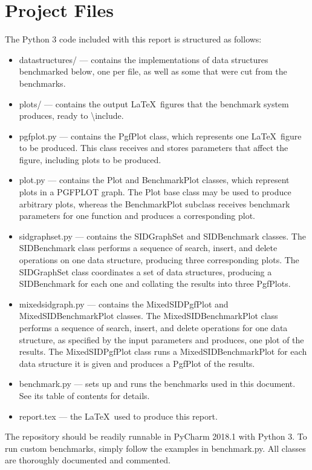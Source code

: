 \documentclass{article}
\begin{document}
\section{Project Files}
The Python 3 code included with this report is structured as follows:
\begin{itemize}
    \item datastructures/ --- contains the implementations of data structures benchmarked below, one per file, as well as some that were cut from the benchmarks.
    \item plots/ --- contains the output \LaTeX \ figures that the benchmark system produces, ready to \textbackslash include.
    \item pgfplot.py --- contains the PgfPlot class, which represents one \LaTeX \ figure to be produced. This class receives and stores parameters that affect the figure, including plots to be produced.
    \item plot.py --- contains the Plot and BenchmarkPlot classes, which represent plots in a PGFPLOT graph. The Plot base class may be used to produce arbitrary plots, whereas the BenchmarkPlot subclass receives benchmark parameters for one function and produces a corresponding plot.
    \item sidgraphset.py --- contains the SIDGraphSet and SIDBenchmark classes. The SIDBenchmark class performs a sequence of search, insert, and delete operations on one data structure, producing three corresponding plots. The SIDGraphSet class coordinates a set of data structures, producing a SIDBenchmark for each one and collating the results into three PgfPlots.
    \item mixedsidgraph.py --- contains the MixedSIDPgfPlot and MixedSIDBenchmarkPlot classes. The MixedSIDBenchmarkPlot class performs a sequence of search, insert, and delete operations for one data structure, as specified by the input parameters and produces, one plot of the results. The MixedSIDPgfPlot class runs a MixedSIDBenchmarkPlot for each data structure it is given and produces a PgfPlot of the results.
    \item benchmark.py --- sets up and runs the benchmarks used in this document. See its table of contents for details.
    \item report.tex --- the \LaTeX \ used to produce this report.
\end{itemize}

The repository should be readily runnable in PyCharm 2018.1 with Python 3. To run custom benchmarks, simply follow the examples in benchmark.py. All classes are thoroughly documented and commented.
\end{document}
